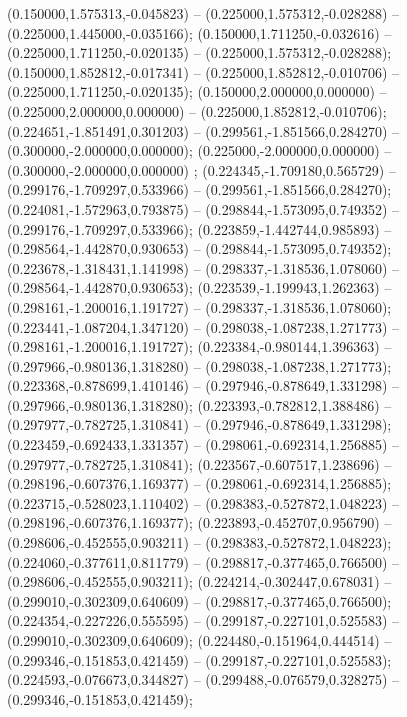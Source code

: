  (0.150000,1.575313,-0.045823) -- (0.225000,1.575312,-0.028288) -- (0.225000,1.445000,-0.035166);
 (0.150000,1.711250,-0.032616) -- (0.225000,1.711250,-0.020135) -- (0.225000,1.575312,-0.028288);
 (0.150000,1.852812,-0.017341) -- (0.225000,1.852812,-0.010706) -- (0.225000,1.711250,-0.020135);
 (0.150000,2.000000,0.000000) -- (0.225000,2.000000,0.000000) -- (0.225000,1.852812,-0.010706);
 (0.224651,-1.851491,0.301203) -- (0.299561,-1.851566,0.284270) -- (0.300000,-2.000000,0.000000);
 (0.225000,-2.000000,0.000000) -- (0.300000,-2.000000,0.000000) ;
 (0.224345,-1.709180,0.565729) -- (0.299176,-1.709297,0.533966) -- (0.299561,-1.851566,0.284270);
 (0.224081,-1.572963,0.793875) -- (0.298844,-1.573095,0.749352) -- (0.299176,-1.709297,0.533966);
 (0.223859,-1.442744,0.985893) -- (0.298564,-1.442870,0.930653) -- (0.298844,-1.573095,0.749352);
 (0.223678,-1.318431,1.141998) -- (0.298337,-1.318536,1.078060) -- (0.298564,-1.442870,0.930653);
 (0.223539,-1.199943,1.262363) -- (0.298161,-1.200016,1.191727) -- (0.298337,-1.318536,1.078060);
 (0.223441,-1.087204,1.347120) -- (0.298038,-1.087238,1.271773) -- (0.298161,-1.200016,1.191727);
 (0.223384,-0.980144,1.396363) -- (0.297966,-0.980136,1.318280) -- (0.298038,-1.087238,1.271773);
 (0.223368,-0.878699,1.410146) -- (0.297946,-0.878649,1.331298) -- (0.297966,-0.980136,1.318280);
 (0.223393,-0.782812,1.388486) -- (0.297977,-0.782725,1.310841) -- (0.297946,-0.878649,1.331298);
 (0.223459,-0.692433,1.331357) -- (0.298061,-0.692314,1.256885) -- (0.297977,-0.782725,1.310841);
 (0.223567,-0.607517,1.238696) -- (0.298196,-0.607376,1.169377) -- (0.298061,-0.692314,1.256885);
 (0.223715,-0.528023,1.110402) -- (0.298383,-0.527872,1.048223) -- (0.298196,-0.607376,1.169377);
 (0.223893,-0.452707,0.956790) -- (0.298606,-0.452555,0.903211) -- (0.298383,-0.527872,1.048223);
 (0.224060,-0.377611,0.811779) -- (0.298817,-0.377465,0.766500) -- (0.298606,-0.452555,0.903211);
 (0.224214,-0.302447,0.678031) -- (0.299010,-0.302309,0.640609) -- (0.298817,-0.377465,0.766500);
 (0.224354,-0.227226,0.555595) -- (0.299187,-0.227101,0.525583) -- (0.299010,-0.302309,0.640609);
 (0.224480,-0.151964,0.444514) -- (0.299346,-0.151853,0.421459) -- (0.299187,-0.227101,0.525583);
 (0.224593,-0.076673,0.344827) -- (0.299488,-0.076579,0.328275) -- (0.299346,-0.151853,0.421459);
